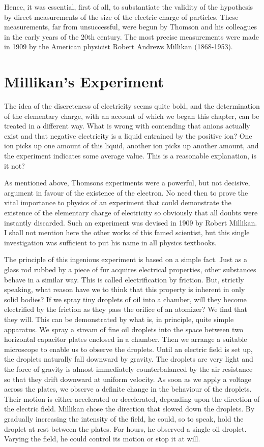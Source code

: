 Hence, it was essential, first of all, to substantiate the validity of the hypothesis by direct measurements of the size of the electric charge of particles. These measurements, far from unsuccessful, were begun by Thomson and his colleagues in the early years of the 20th century. The most precise measurements were made in 1909 by the American physicist Robert Andrews Millikan (1868-1953).


\section{Millikan's Experiment}
The idea of the discreteness of electricity seems quite bold, and the determination of the elementary charge, with an account of which we began this chapter, can be treated in a different way. What is wrong with contending that anions actually exist and that negative electricity is a liquid entrained by the positive ion? One ion picks up one amount of this liquid, another ion picks up another amount, and the experiment indicates some average value. This is a reasonable explanation, is it not?

As mentioned above, Thomsons experiments were a powerful, but not decisive, argument in favour of the existence of the electron. No need then to prove the vital importance to physics of an experiment that could demonstrate the existence of the elementary charge of electricity so obviously that all doubts were instantly discarded. Such an experiment was devised in 1909 by Robert Millikan. I shall not mention here the other works of this famed scientist, but this single investigation was sufficient to put his name in all physics textbooks.
	
The principle of this ingenious experiment is based on a simple fact. Just as a glass rod rubbed by a piece of fur acquires electrical properties, other substances behave in a similar way. This is called electrification by friction. But, strictly speaking, what reason have we to think that this property is inherent in only solid bodies? If we spray tiny droplets of oil into a chamber, will they become electrified by the friction as they pass the orifice of an atomizer? We find that they will. This can be demonstrated by what is, in principle, quite simple apparatus. We spray a stream of fine oil droplets into the space between two horizontal capacitor plates enclosed in a chamber. Then we arrange a suitable microscope to enable us to observe the droplets. Until an electric field is set up, the droplets naturally fall downward by gravity. The droplets are very light and the force of gravity is almost immediately counterbalanced by the air resistance so that they drift downward at uniform velocity. As soon as we apply a voltage across the plates, we observe a definite change in the behaviour of the droplets. Their motion is either accelerated or decelerated, depending upon the direction of the electric field. Millikan chose the direction that slowed down the droplets. By gradually increasing the intensity of the field, he could, so to speak, hold the droplet at rest between the plates. For hours, he observed a single oil droplet. Varying the field, he could control its motion or stop it at will.

